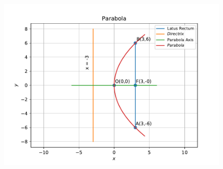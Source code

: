 \begin{enumerate}
\begin{figure}[!h]
\begin{center}
		\includegraphics[width=\columnwidth]{chapters/11/11/2/1/figs/problem1.pdf}
	\end{center}
\caption{}
\label{fig:11/11/2/1Fig1}
\end{figure}
\end{enumerate}
